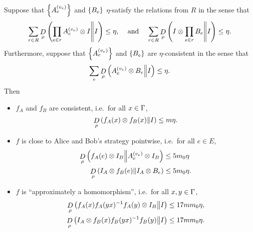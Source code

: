 \begin{appendices}
\begin{lemma}
	Suppose that $\left\{A_e^{(v_e)}\right\}$ and $\left\{B_e\right\}$ $\eta$-satisfy the relations from $R$ in the sense that
	\begin{align}
	\label{lemma:canonical-form-implies-stability-1-appendix}
		\sum_{r\in R} \mathop{D}\limits_{\rho}\left(\prod_{e\in r}{A_e^{(v_e)}\otimes I}\middle\| I\right) \leq \eta, 
		&&\text{ and }
		&&
		\sum_{r\in R} \mathop{D}\limits_{\rho}\left(I\otimes \prod_{e\in r}{B_e}\middle\| I\right) \leq \eta.
	\end{align}
	 Furthermore, suppose that $\left\{A_e^{(v_e)}\right\}$ and $\left\{B_e\right\}$ are $\eta$-consistent in the sense that
	 \begin{equation}
	 \label{lemma:canonical-form-implies-stability-2-appendix}
	 	\sum_e\mathop{D}\limits_{\rho}\left(A_e^{(v_e)}\otimes B_e\middle\| I\right) \leq \eta.
	 \end{equation}
	 Then 
 \begin{itemize}
	\item $f_A$ and $f_B$ are consistent, i.e.\ for all $x\in \Gamma$,
	\begin{equation}
	\label{eq:canonical-form-implies-consistency-appendix-appendix}
		\mathop{D}\limits_{\rho}\left(f_A(x)\otimes f_B(x)\middle\| I\right) \leq m\eta.
	\end{equation}
 	\item $f$ is close to Alice and Bob's strategy pointwise, i.e.\ for all $e\in E$,
	  \begin{align}
	  \label{eq:canonical-form-implies-stability-conclusion-1-appendix-appendix}
	  	\mathop{D}\limits_{\rho}\left(f_A(e)\otimes I_B\middle\|  A_e^{(v_e)}\otimes I_B \right) &\leq 5m_0\eta
	  	\\
	  	\mathop{D}\limits_{\rho}\left(I_A \otimes f_B(e)\middle\|  I_A \otimes B_e\right) &\leq 5m_0\eta. 
	  \end{align}
	  \item $f$ is ``approximately a homomorphism'', i.e.\ for all $x,y\in \Gamma$, 
	\begin{align}
	\label{eq:canonical-form-implies-stability-appendix-appendix}
		\mathop{D}\limits_{\rho}\left(f_A(x)f_A(yx)^{-1}f_A(y)\otimes I_B\middle\| I\right) &\leq 17mm_0\eta,
		\\
		\mathop{D}\limits_{\rho}\left(I_A\otimes f_B(x)f_B(yx)^{-1}f_B(y)\middle\| I\right) &\leq 17mm_0\eta.
	\end{align}
 \end{itemize}

\end{lemma}


\end{appendices}